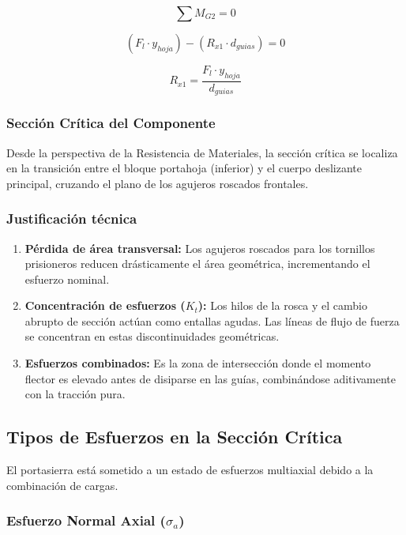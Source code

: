\documentclass[12pt,letterpaper]{article}
\begin{document}
\[
\sum M_{G2} = 0
\]

\[
(F_l \cdot y_{hoja}) - (R_{x1} \cdot d_{guias}) = 0
\]

\[
R_{x1} = \frac{F_l \cdot y_{hoja}}{d_{guias}}
\]


\subsubsection{Sección Crítica del Componente}

Desde la perspectiva de la Resistencia de Materiales, la sección crítica se localiza en la transición entre el bloque portahoja (inferior) y el cuerpo deslizante principal, cruzando el plano de los agujeros roscados frontales.

\subsubsection*{Justificación técnica}

\begin{enumerate}
    \item \textbf{Pérdida de área transversal:} Los agujeros roscados para los tornillos prisioneros reducen drásticamente el área geométrica, incrementando el esfuerzo nominal.

    \item \textbf{Concentración de esfuerzos ($K_t$):} Los hilos de la rosca y el cambio abrupto de sección actúan como entallas agudas. Las líneas de flujo de fuerza se concentran en estas discontinuidades geométricas.

    \item \textbf{Esfuerzos combinados:} Es la zona de intersección donde el momento flector es elevado antes de disiparse en las guías, combinándose aditivamente con la tracción pura.
\end{enumerate}


\subsection{Tipos de Esfuerzos en la Sección Crítica}

El portasierra está sometido a un estado de esfuerzos multiaxial debido a la combinación de cargas.

\subsubsection{Esfuerzo Normal Axial ($\sigma_a$)}
\end{document}
